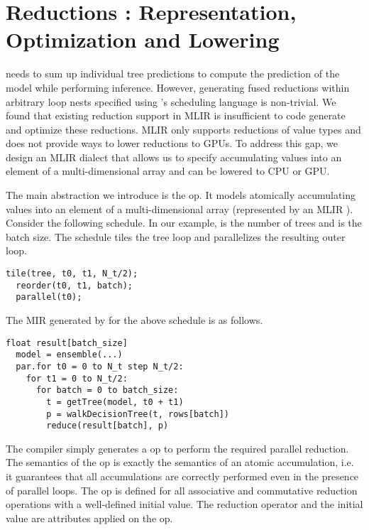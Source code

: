 \section{Reductions : Representation, Optimization and Lowering}
\label{sec:reduction}
\Treebeard{} needs to sum up individual tree predictions to compute 
the prediction of the model while performing inference. However,
generating fused reductions within arbitrary loop nests specified 
using \Treebeard{}'s scheduling language is non-trivial. We found 
that existing reduction support in MLIR is insufficient to code
generate and optimize these reductions. MLIR only supports reductions
of value types and does not provide ways to lower reductions to GPUs. 
To address this gap, we design an MLIR dialect that allows us to
specify accumulating values into an element of a multi-dimensional array
and can be lowered to CPU or GPU. 

The main abstraction we introduce is the  op. It models 
atomically accumulating values into an element of a 
multi-dimensional array (represented by an MLIR ).
Consider the following \Treebeard{} schedule.
In our example,  is the number of trees 
and  is the batch size. The schedule tiles the 
tree loop and parallelizes the resulting outer loop.
\begin{lstlisting}[style=c++]
  tile(tree, t0, t1, N_t/2);
  reorder(t0, t1, batch);
  parallel(t0);
\end{lstlisting}

The MIR generated by \Treebeard{} for the above schedule is as follows. 
\begin{lstlisting}[style=c++]
  float result[batch_size]
  model = ensemble(...) 
  par.for t0 = 0 to N_t step N_t/2:
    for t1 = 0 to N_t/2:
      for batch = 0 to batch_size:
        t = getTree(model, t0 + t1) 
        p = walkDecisionTree(t, rows[batch])
        reduce(result[batch], p)
\end{lstlisting}

The compiler simply generates a  op to perform
the required parallel reduction. 
The semantics of the  op is exactly the semantics of 
an atomic accumulation, i.e. it guarantees that all accumulations 
are correctly performed even in the presence of parallel loops. 
The  op is defined for all associative and commutative
reduction operations with a well-defined initial value. The 
reduction operator and the initial value are attributes applied
on the  op. 

